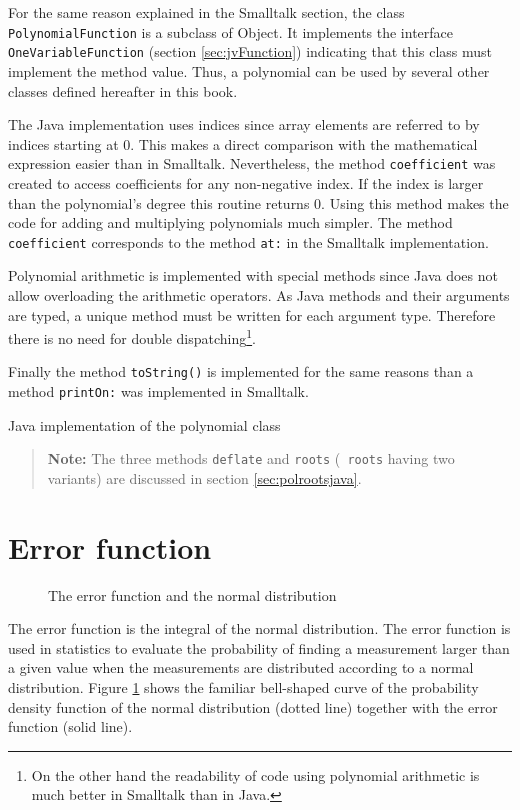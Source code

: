 \documentclass[twoside]{book}
\begin{document}
For the same reason explained in the Smalltalk section, the class
{\tt PolynomialFunction} is a subclass of Object. It implements
the interface {\tt OneVariableFunction} (\cf section
\ref{sec:jvFunction}) indicating that this class must implement
the method value. Thus, a polynomial can be used by several other
classes defined hereafter in this book.

The Java implementation uses indices since array elements are
referred to by indices starting at 0. This makes a direct
comparison with the mathematical expression easier than in
Smalltalk. Nevertheless, the method {\tt coefficient} was created
to access coefficients for any non-negative index. If the index is
larger than the polynomial's degree this routine returns 0. Using
this method makes the code for adding and multiplying polynomials
much simpler. The method {\tt coefficient} corresponds to the
method {\tt at:} in the Smalltalk implementation.

Polynomial arithmetic is implemented with special methods since
Java does not allow overloading the arithmetic operators. As Java
methods and their arguments are typed, a unique method must be
written for each argument type. Therefore there is no need for
double dispatching\footnote{On the other hand the readability of
code using polynomial arithmetic is much better in Smalltalk than
in Java.}.

Finally the method {\tt toString()} is implemented for the same
reasons than a method {\tt printOn:} was implemented in Smalltalk.

\begin{listing}
Java implementation of the polynomial class
\label{lj:polynomial}

\end{listing}
\begin{quote}
{\bf Note:} The three methods {\tt deflate} and {\tt roots} ({\tt
roots} having two variants) are discussed in section
\ref{sec:polrootsjava}.
\end{quote}


\section{Error function}
\label{sec:errorFunction}
\begin{figure}
\center{}
\caption{The error function and the normal
distribution}\label{fig:errorFunction}
\end{figure}
The error function is the integral of the normal distribution. The
error function is used in statistics to evaluate the probability
of finding a measurement larger than a given value when the
measurements are distributed according to a normal distribution.
Figure \ref{sec:errorFunction} shows the familiar bell-shaped
curve of the probability density function of the normal
distribution (dotted line) together with the error function (solid
line).
\end{document}
